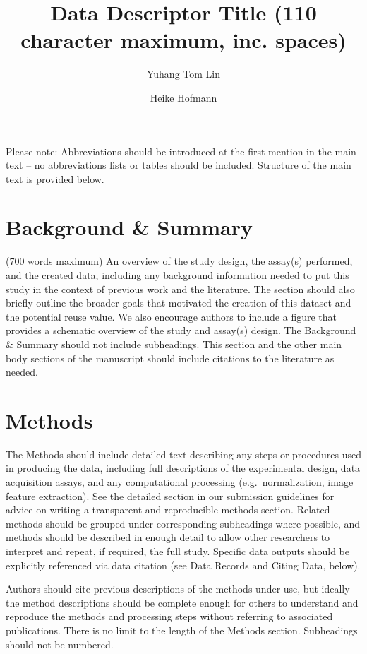\documentclass[fleqn,10pt]{wlscirep}
\title{Data Descriptor Title (110 character maximum, inc. spaces)}
\author[1,2]{Yuhang Tom Lin}
\author[1,2]{Heike Hofmann}
\affil[1]{Iowa State University, Department of Statistics, Ames, }
\affil[2]{Center for Statistics and Applications in Forensic Evidence
(CSAFE), Iowa State University, Ames, }
\affil[*]{corresponding author(s): Derek Author (corresponding.author@email.example)}
\begin{document}
\flushbottom
\maketitle

\thispagestyle{empty}

\noindent Please note: Abbreviations should be introduced at the first
mention in the main text -- no abbreviations lists or tables should be
included. Structure of the main text is provided below.

\section*{Background \& Summary}

(700 words maximum) An overview of the study design, the assay(s)
performed, and the created data, including any background information
needed to put this study in the context of previous work and the
literature. The section should also briefly outline the broader goals
that motivated the creation of this dataset and the potential reuse
value. We also encourage authors to include a figure that provides a
schematic overview of the study and assay(s) design. The Background \&
Summary should not include subheadings. This section and the other main
body sections of the manuscript should include citations to the
literature as needed.

\section*{Methods}

The Methods should include detailed text describing any steps or
procedures used in producing the data, including full descriptions of
the experimental design, data acquisition assays, and any computational
processing (e.g.~normalization, image feature extraction). See the
detailed section in our submission guidelines for advice on writing a
transparent and reproducible methods section. Related methods should be
grouped under corresponding subheadings where possible, and methods
should be described in enough detail to allow other researchers to
interpret and repeat, if required, the full study. Specific data outputs
should be explicitly referenced via data citation (see Data Records and
Citing Data, below).

Authors should cite previous descriptions of the methods under use, but
ideally the method descriptions should be complete enough for others to
understand and reproduce the methods and processing steps without
referring to associated publications. There is no limit to the length of
the Methods section. Subheadings should not be numbered.
\end{document}
